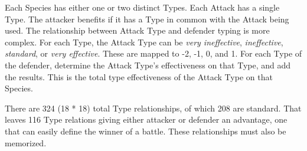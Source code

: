 Each Species has either one or two distinct Types.
Each Attack has a single Type.
The attacker benefits if it has a Type in common with the Attack being used.
The relationship between Attack Type and defender typing is more complex.
For each Type, the Attack Type can be \textit{very ineffective},
 \textit{ineffective}, \textit{standard}, or \textit{very effective}.
These are mapped to -2, -1, 0, and 1.
For each Type of the defender, determine the Attack Type's effectiveness
 on that Type, and add the results.
This is the total type effectiveness of the Attack Type on that Species.

There are 324 (18 * 18) total Type relationships, of which 208 are standard.
That leaves 116 Type relations giving either attacker or defender an advantage,
 one that can easily define the winner of a battle.
These relationships must also be memorized.


